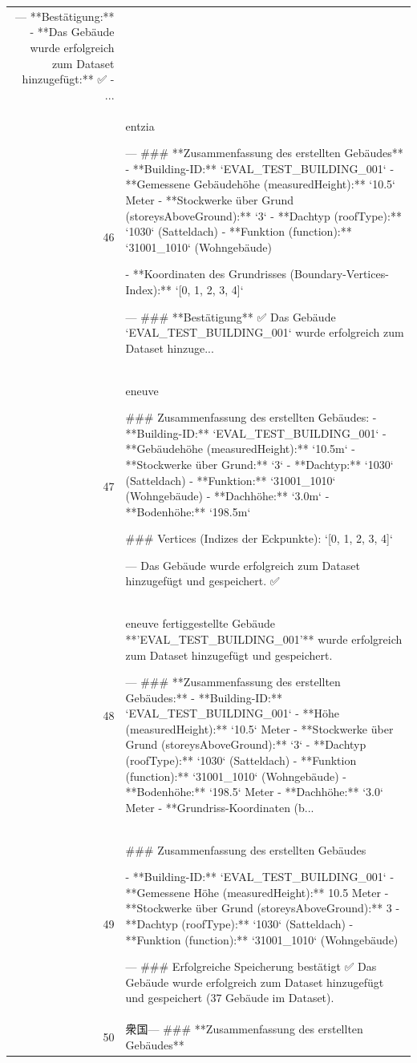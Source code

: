 \documentclass[a4paper,11pt]{article}
\begin{document}
\begin{table}[ht]
\begin{tabular}{r p{12cm}}
---
**Bestätigung:**
- **Das Gebäude wurde erfolgreich zum Dataset hinzugefügt:** ✅
- ... \\
46 & entzia

---
\#\#\# **Zusammenfassung des erstellten Gebäudes**
- **Building-ID:** `EVAL\_TEST\_BUILDING\_001`
- **Gemessene Gebäudehöhe (measuredHeight):** `10.5` Meter
- **Stockwerke über Grund (storeysAboveGround):** `3`
- **Dachtyp (roofType):** `1030` (Satteldach)
- **Funktion (function):** `31001\_1010` (Wohngebäude)

- **Koordinaten des Grundrisses (Boundary-Vertices-Index):**
  `[0, 1, 2, 3, 4]`

---
\#\#\# **Bestätigung**
✅ Das Gebäude `EVAL\_TEST\_BUILDING\_001` wurde erfolgreich zum Dataset hinzuge... \\
47 & eneuve

\#\#\# Zusammenfassung des erstellten Gebäudes:
- **Building-ID:** `EVAL\_TEST\_BUILDING\_001`
- **Gebäudehöhe (measuredHeight):** `10.5m`
- **Stockwerke über Grund:** `3`
- **Dachtyp:** `1030` (Satteldach)
- **Funktion:** `31001\_1010` (Wohngebäude)
- **Dachhöhe:** `3.0m`
- **Bodenhöhe:** `198.5m`

\#\#\# Vertices (Indizes der Eckpunkte):
`[0, 1, 2, 3, 4]`

---
Das Gebäude wurde erfolgreich zum Dataset hinzugefügt und gespeichert. ✅ \\
48 & eneuve fertiggestellte Gebäude **'EVAL\_TEST\_BUILDING\_001'** wurde erfolgreich zum Dataset hinzugefügt und gespeichert.

---
\#\#\# **Zusammenfassung des erstellten Gebäudes:**
- **Building-ID:** `EVAL\_TEST\_BUILDING\_001`
- **Höhe (measuredHeight):** `10.5` Meter
- **Stockwerke über Grund (storeysAboveGround):** `3`
- **Dachtyp (roofType):** `1030` (Satteldach)
- **Funktion (function):** `31001\_1010` (Wohngebäude)
- **Bodenhöhe:** `198.5` Meter
- **Dachhöhe:** `3.0` Meter
- **Grundriss-Koordinaten (b... \\
49 & \#\#\# Zusammenfassung des erstellten Gebäudes

- **Building-ID:** `EVAL\_TEST\_BUILDING\_001`
- **Gemessene Höhe (measuredHeight):** 10.5 Meter
- **Stockwerke über Grund (storeysAboveGround):** 3
- **Dachtyp (roofType):** `1030` (Satteldach)
- **Funktion (function):** `31001\_1010` (Wohngebäude)

---
\#\#\# Erfolgreiche Speicherung bestätigt
✅ Das Gebäude wurde erfolgreich zum Dataset hinzugefügt und gespeichert (37 Gebäude im Dataset). \\
50 & 衆国---
\#\#\# **Zusammenfassung des erstellten Gebäudes**


\end{tabular}
\end{table}
\end{document}
